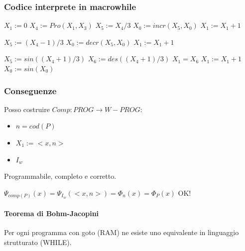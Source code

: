 \documentclass{article}
\begin{document}
\subsubsection{Codice interprete in macrowhile}
\begin{algorithm}
        \begin{algorithmic}[1]
        		 $X_1:=0$ 
        		\Else
        			\State $X_4 := Pro(X_1,X_3)$ 
				 
					\State $X_5 := X_4/3$
					\State $X_0:= incr(X_5,X_0)$ 
					\State $X_1:=X_1+1$ 
            		\EndIf
            		
            		 
					\State $X_5 := (X_4-1)/3$
					\State $X_0:= decr(X_5,X_0)$ 
					\State $X_1:=X_1+1$ 
            		\EndIf
            		
            		 
					\State $X_5 := sin((X_4+1)/3)$
					\State $X_6 := des((X_4+1)/3)$
						\State $X_1=X_6$
					\Else 
						\State $X_1:=X_1+1$ 
					\EndIf
            		\EndIf
            \EndIf
            \EndWhile
            \State $X_0:=sin(X_0)$
        \end{algorithmic}
    \end{algorithm}

\subsubsection{Conseguenze}
Posso costruire $Comp:PROG\rightarrow W-PROG$:
\begin{itemize}
	\item $n=cod(P)$
	\item $X_1 := <x,n>$
	\item $I_w$
\end{itemize}
Programmabile, completo e corretto.




$\Psi_{comp(P)}(x)=\Psi_{I_w}(<x,n>)=\Phi_n(x)=\Phi_P(x)$ OK!
\paragraph{Teorema di Bohm-Jacopini} Per ogni programma con goto (RAM) ne esiste uno equivalente in linguaggio strutturato (WHILE).
\end{document}
